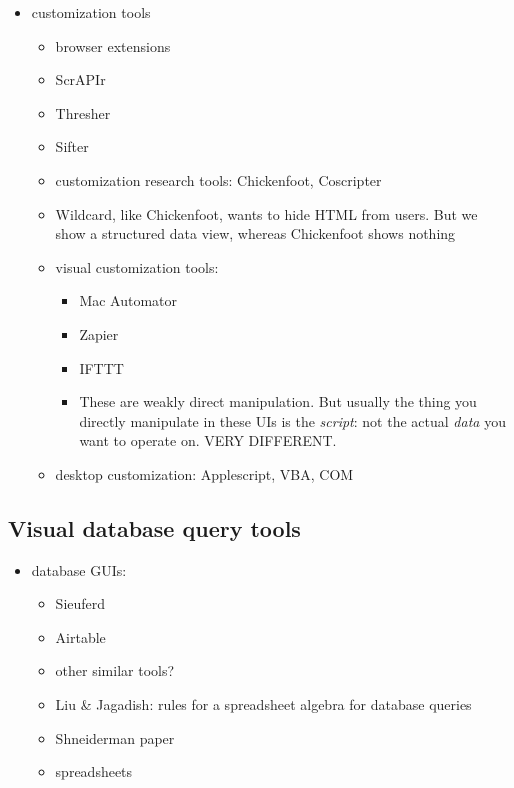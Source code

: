 \documentclass[sigplan,10pt,anonymous,review]{acmart}
\providecommand{\tightlist}{%
  \setlength{\itemsep}{0pt}\setlength{\parskip}{0pt}}
\begin{document}
\begin{itemize}
\tightlist
\item
  customization tools

  \begin{itemize}
  \tightlist
  \item
    browser extensions
  \item
    ScrAPIr
  \item
    Thresher
  \item
    Sifter
  \item
    customization research tools: Chickenfoot, Coscripter
  \item
    Wildcard, like Chickenfoot, wants to hide HTML from users. But we
    show a structured data view, whereas Chickenfoot shows nothing
  \item
    visual customization tools:

    \begin{itemize}
    \tightlist
    \item
      Mac Automator
    \item
      Zapier
    \item
      IFTTT
    \item
      These are weakly direct manipulation. But usually the thing you
      directly manipulate in these UIs is the \emph{script}: not the
      actual \emph{data} you want to operate on. VERY DIFFERENT.
    \end{itemize}
  \item
    desktop customization: Applescript, VBA, COM
  \end{itemize}
\end{itemize}

\hypertarget{visual-database-query-tools}{%
\subsection{Visual database query
tools}\label{visual-database-query-tools}}

\begin{itemize}
\tightlist
\item
  database GUIs:

  \begin{itemize}
  \tightlist
  \item
    Sieuferd \citep{bakke2016}
  \item
    Airtable \citep{2020a}
  \item
    other similar tools?
  \item
    Liu \& Jagadish: rules for a spreadsheet algebra for database
    queries \citep{liu2009}
  \item
    Shneiderman paper
  \item
    spreadsheets
  \end{itemize}
\end{itemize}
\end{document}
